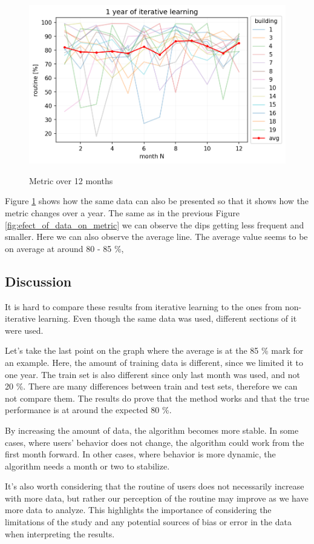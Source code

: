 \begin{figure}[H]
	\centering
	\caption{Metric over 12 months}
	\includegraphics[width=.7\textwidth]{Figures/EC/DYN/1_year_of_iterative_learning_avg.png}
	\label{fig:1_year_of_iterative_learning_avg}
\end{figure}

Figure \ref{fig:1_year_of_iterative_learning_avg} shows how the same data can also be presented so that it shows how the metric changes over a year.
The same as in the previous Figure \ref{fig:efect_of_data_on_metric} we can observe the dips getting less frequent and smaller. 
Here we can also observe the average line. 
The average value seems to be on average at around 80 - 85 \%,

\subsection{Discussion}

It is hard to compare these results from iterative learning to the ones from non-iterative learning.
Even though the same data was used, different sections of it were used.

Let's take the last point on the graph where the average is at the 85 \% mark for an example.
Here, the amount of training data is different, since we limited it to one year. 
The train set is also different since only last month was used, and not 20 \%. 
There are many differences between train and test sets, therefore we can not compare them.
The results do prove that the method works and that the true performance is at around the expected 80 \%.

By increasing the amount of data, the algorithm becomes more stable.
In some cases, where users' behavior does not change, the algorithm could work
from the first month forward. In other cases, where behavior is more dynamic, 
the algorithm needs a month or two to stabilize. 

It's also worth considering that the routine of users does not necessarily increase with more data,
but rather our perception of the routine may improve as we have more data to analyze.
This highlights the importance of considering the limitations of the study and any potential sources of bias or error in the data when interpreting the results.

